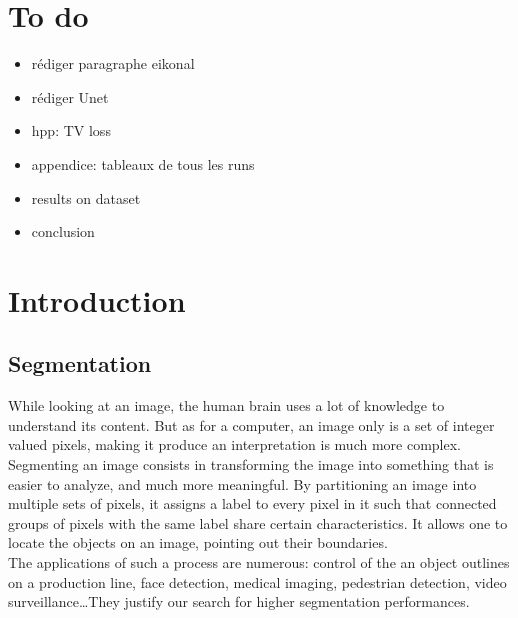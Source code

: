\documentclass{article}
\begin{document}
\section*{To do}
    \begin{itemize}
        \item rédiger paragraphe eikonal
        \item rédiger Unet
        \item hpp: TV loss
        \item appendice: tableaux de tous les runs
        \item results on dataset
        \item conclusion
    \end{itemize}

\section{Introduction}

    \subsection{Segmentation}
        While looking at an image, the human brain uses a lot of knowledge to understand its content. But as for a computer, an image only is a set of integer valued pixels, making it produce an interpretation is much more complex. Segmenting an image consists in transforming the image into something that is easier to analyze, and much more meaningful. By partitioning an image into multiple sets of pixels, it assigns a label to every pixel in it such that connected groups of pixels with the same label share certain characteristics. It allows one to locate the objects on an image, pointing out their boundaries.\\
        The applications of such a process are numerous: control of the an object outlines on a production line, face detection, medical imaging, pedestrian detection, video surveillance\ldots They justify our search for higher segmentation performances.
\end{document}
